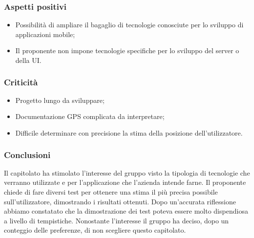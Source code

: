 	\subsubsection{Aspetti positivi}
		\begin{itemize}
			\item Possibilità di ampliare il bagaglio di tecnologie conosciute per lo sviluppo di applicazioni mobile;
			\item Il proponente non impone tecnologie specifiche per lo sviluppo del server o
			della UI.
		\end{itemize}

	\subsubsection{Criticità}
		\begin{itemize}
			\item Progetto lungo da sviluppare;
			\item Documentazione GPS complicata da interpretare;
			\item Difficile determinare con precisione la stima della posizione dell'utilizzatore.
		\end{itemize}

	\subsubsection{Conclusioni}
		Il capitolato ha stimolato l'interesse del gruppo visto la tipologia di tecnologie che verranno utilizzate e per l'applicazione che l'azienda intende farne. Il proponente chiede di fare diversi test per ottenere una stima il più precisa possibile sull'utilizzatore, dimostrando i risultati ottenuti. Dopo un'accurata riflessione abbiamo constatato che la dimostrazione dei test poteva essere molto dispendiosa a livello di tempistiche. Nonostante l'interesse il gruppo ha deciso, dopo un conteggio delle preferenze, di non scegliere questo capitolato.
